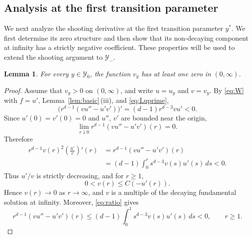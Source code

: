 \documentclass[12pt, a4paper, reqno]{amsart}
\numberwithin{equation}{section}
\newtheorem{lemma}[theorem]{Lemma}
\theoremstyle{definition}
\theoremstyle{remark}
\begin{document}
\subsection{Analysis at the first transition parameter}

We next analyze the shooting derivative at the first transition parameter
$y^*$. We first determine its zero structure and then show that its
non-decaying component at infinity has a strictly negative coefficient. 
These properties will be used to extend the shooting argument to $\mathcal Y_-$.

\begin{lemma}\label{lem:vzero}
For every $y\in \mathcal Y_0$, the function $v_y$ has at least one zero in
$(0,\infty)$.
\end{lemma}

\begin{proof}
Assume that $v_y>0$ on $(0,\infty)$, and write $u=u_y$ and $v=v_y$.
By \eqref{eq:W} with $f=u'$, Lemma~\ref{lem:basic}\,\textup{(iii)}, and \eqref{eq:Luprime},
\[
  \bigl(r^{d-1}(vu''-u'v')\bigr)'
  =(d-1)r^{d-3}vu'<0.
\]
Since $u'(0)=v'(0)=0$ and $u''$, $v'$ are bounded near the origin,
\[
  \lim_{r\downarrow0}r^{d-1}(vu''-u'v')(r)=0.
\]
Therefore
\begin{equation}\label{eq:ratio}
\begin{aligned}
  r^{d-1}v(r)^2\left(\frac{u'}{v}\right)'(r)
  &=r^{d-1}(vu''-u'v')(r)\\
  &=(d-1)\int_0^r s^{d-3}v(s)u'(s)\,ds<0.
\end{aligned}
\end{equation}
Thus $u'/v$ is strictly decreasing, and for $r\ge1$,
\[
  0<v(r)\le C(-u'(r)).
\]
Hence $v(r)\to0$ as $r\to\infty$, and $v$ is a multiple of the decaying
fundamental solution at infinity. Moreover, \eqref{eq:ratio} gives
\begin{equation}\label{eq:Wneg}
  r^{d-1}(vu''-u'v')(r)
  \le(d-1)\int_0^1s^{d-3}v(s)u'(s)\,ds<0,
  \qquad r\ge1.
\end{equation}


\end{proof}
\end{document}
